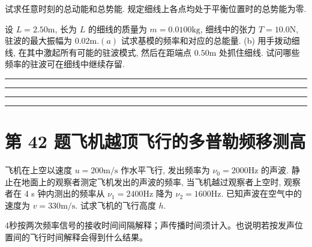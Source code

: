 \documentclass[UTF8,fontset=fandol,a4paper,11pt]{ctexart}
\newcommand{\tagline}[1]{\noindent{\small\color{muted}#1}\par}
\newcommand{\figcaption}[1]{\par\vspace{2pt}{\small\color{muted}#1}\par}
\newcommand{\workarea}{\par\vspace{7mm}\noindent{\small\color{muted}作答区}\par\vspace{4mm}
\noindent\textcolor{rulegray}{\rule{\linewidth}{0.3pt}}\par\vspace{16mm}
\noindent\textcolor{rulegray}{\rule{\linewidth}{0.3pt}}\par\vspace{16mm}
\noindent\textcolor{rulegray}{\rule{\linewidth}{0.3pt}}\par\vspace{16mm}
\noindent\textcolor{rulegray}{\rule{\linewidth}{0.3pt}}}
\begin{document}
试求任意时刻的总动能和总势能.
规定细线上各点均处于平衡位置时的总势能为零.

设 \(L=2.50 \mathrm{m}\), 长为 \(L\) 的细线的质量为
\(m=0.0100 \mathrm{kg}\), 细线中的张力 \(T=10.0 \mathrm{N}\),
驻波的最大振幅为 \(0.02 \mathrm{m} .(a)\) 试求基模的频率和对应的总能量.
(b) 用手拨动细线, 在其中激起所有可能的驻波模式, 然后在距端点
\(0.50 \mathrm{m}\) 处抓住细线. 试问哪些频率的驻波可在细线中继续存留.

\begin{center}\begin{minipage}{\linewidth}\centering{}\figcaption{图 7.41}\end{minipage}\end{center}

\workarea

\clearpage


\section*{第 42 题\quad 飞机越顶飞行的多普勒频移测高}

\tagline{M-07-42}

飞机在上空以速度 \(u=200 \mathrm{m} / \mathrm{s}\) 作水平飞行,
发出频率为 \(\nu_{0}=2000 \mathrm{Hz}\) 的声波.
静止在地面上的观察者测定飞机发出的声波的频率, 当飞机越过观察者上空时,
观察者在 4 s 钟内测出的频率从 \(\nu_{1}=2400 \mathrm{Hz}\) 降为
\(\nu_{2}=1600 \mathrm{Hz}\). 已知声波在空气中的速度为
\(v=330 \mathrm{m} / \mathrm{s}\). 试求飞机的飞行高度 \(h\).

4秒按两次频率信号的接收时间间隔解释；声传播时间须计入。也说明若按发声位置间的飞行时间解释会得到什么结果。
\end{document}

